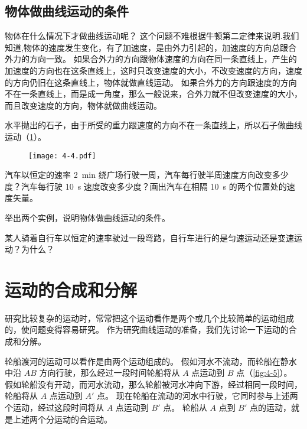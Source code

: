 \subsection{物体做曲线运动的条件}

物体在什么情况下才做曲线运动呢？
这个问题不难根据牛顿第二定律来说明.我们知道,物体的速度发生变化，有了加速度，是由外力引起的，加速度的方向总跟合外力的方向一致。
如果合外力的方向跟物体速度的方向在同一条直线上，产生的加速度的方向也在这条直线上，这时只改变速度的大小，不改变速度的方向，速度的方向仍旧在这条直线上，物体就做直线运动。
如果合外力的方向跟速度的方向不在一条直线上，而是成一角度，那么一般说来，合外力就不但改变速度的大小，而且改变速度的方向，物体就做曲线运动。

水平抛出的石子，由于所受的重力跟速度的方向不在一条直线上，所以石子做曲线运动（\cref{fig:4-4}）。

\begin{figure}
  \texttt{[image: 4-4.pdf]}
  \caption{}\label{fig:4-4}
\end{figure}
 
\begin{Practice}
\begin{question}
  \item 汽车以恒定的速率 \qty{2}{min} 绕广场行驶一周，汽车每行驶半周速度方向改变多少度？汽车每行驶 \qty{10}{s} 速度改变多少度？画出汽车在相隔 \qty{10}{s} 的两个位置处的速度矢量。
  \item 举出两个实例，说明物体做曲线运动的条件。
  \item 某人骑着自行车以恒定的速率驶过一段弯路，自行车进行的是匀速运动还是变速运动？为什么？
\end{question}
\end{Practice}

\section{运动的合成和分解}
研究比较复杂的运动时，常常把这个运动看作是两个或几个比较简单的运动组成的，使问题变得容易研究。
作为研究曲线运动的准备，我们先讨论一下运动的合成和分解。

轮船渡河的运动可以看作是由两个运动组成的。
假如河水不流动，而轮船在静水中沿 $AB$ 方向行驶，那么经过一段时间轮船将从 $A$ 点运动到 $B$ 点（\cref{fig:4-5}）。
假如轮船没有开动，而河水流动，那么轮船被河水冲向下游，经过相同一段时间，轮船将从 $A$ 点运动到 $A'$ 点。
现在轮船在流动的河水中行驶，它同时参与上述两个运动，经过这段时间将从 $A$ 点运动到 $B'$ 点。
轮船从 $A$ 点到 $B'$ 点的运动，就是上述两个分运动的合运动。

